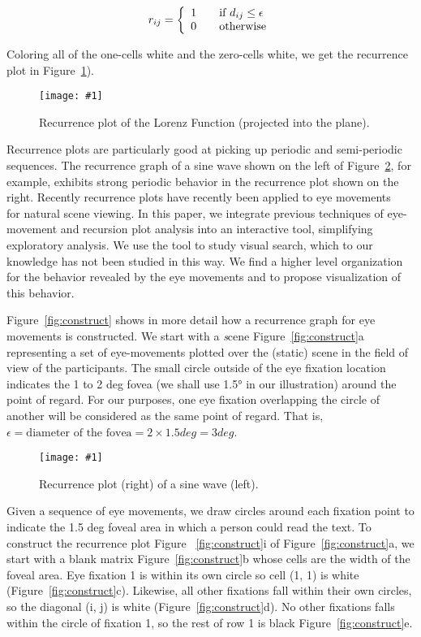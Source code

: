 \documentclass{sigchi}
\newcommand{\insertpicture}[2]{\begin{center}\texttt{[image: \#1]}\end{center}}
\begin{document}
\[ 
r_{ij} = \left\{
	\begin{array}{l l} 
    1  & \quad \text{if $d_{ij} \leq \epsilon$}\\ 
    0  & \quad \text{otherwise} 
    \end{array} \right. 
\]

Coloring all of the one-cells white and the zero-cells white, we get
the recurrence plot in Figure~\ref{fig:lorenz}).

\begin{figure}
	\insertpicture{figures/lorenz.pdf}{0.45}
	\caption{Recurrence plot of the Lorenz Function (projected into the
		plane).\label{fig:lorenz}}
\end{figure}


Recurrence plots are particularly good at picking up
periodic and semi-periodic sequences. The recurrence graph of a sine wave
shown on the left of Figure~\ref{fig:sine}, for example, exhibits strong
periodic behavior in the recurrence plot shown on the right. Recently
recurrence plots have recently been applied to eye movements
~\cite{Anderson_2013} for natural scene viewing. In this paper, we integrate previous
techniques of eye-movement and recursion plot analysis into an interactive
tool, simplifying exploratory analysis. We use the tool to study visual
search, which to our knowledge has not been studied in this way. 
We find  a higher level organization for the behavior revealed by 
the eye movements and to propose visualization of this behavior.  


Figure~\ref{fig:construct} shows in more detail how a recurrence graph for eye
movements is constructed. We start with a {\emph scene} Figure~\ref{fig:construct}a
representing  a set of eye-movements plotted over the (static) scene in the
field of view of the participants. The small circle outside of the eye
fixation location indicates the 1 to 2 deg fovea (we shall use 1.5° in our
illustration) around the point of regard. For our purposes, one eye
fixation overlapping the circle of another will be considered as the same
point of regard. That is, $\epsilon = \text{diameter of the fovea} = 2
\times 1.5 deg = 3 deg $. 

\begin{figure}
	\insertpicture{figures/sine.pdf}{0.45}
	\caption{
    Recurrence plot (right) of a sine wave (left).
    \label{fig:sine}
    }
\end{figure}


Given a sequence of eye movements, we draw circles around each fixation
point to indicate the 1.5 deg foveal area in which a person could read the
text. To construct the recurrence plot Figure ~\ref{fig:construct}i of
Figure~\ref{fig:construct}a, we start with a blank matrix Figure~\ref{fig:construct}b whose
cells are the width of the foveal area. Eye fixation 1  is within its own
circle so cell (1, 1) is white (Figure~\ref{fig:construct}c). Likewise, 
all other fixations fall within their own circles, so the diagonal (i, j) 
is white (Figure~\ref{fig:construct}d). No other fixations falls within 
the circle of fixation 1, so the rest of row 1 is black 
Figure~\ref{fig:construct}e. 
\end{document}

